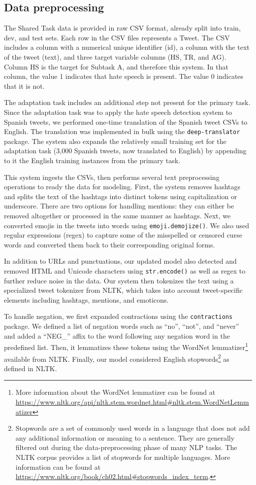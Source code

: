 \documentclass[11pt,a4paper]{article}
\begin{document}
\subsection{Data preprocessing}
The Shared Task data is provided in raw CSV format, already split into train, dev, and test sets. Each row in the CSV files represents a Tweet. The CSV includes a column with a numerical unique identifier (id), a column with the text of the tweet (text), and three target variable columns (HS, TR, and AG). Column HS is the target for Subtask A, and therefore this system. In that column, the value 1 indicates that hate speech is present. The value 0 indicates that it is not.

The adaptation task includes an additional step not present for the primary task. Since the adaptation task was to apply the hate speech detection system to Spanish tweets, we performed one-time translation of the Spanish tweet CSVs to English. The translation was implemented in bulk using the \verb|deep-translator| package. The system also expands the relatively small training set for the adaptation task (3,000 Spanish tweets, now translated to English) by appending to it the English training instances from the primary task.

This system ingests the CSVs, then performs several text preprocessing operations to ready the data for modeling. First, the system removes hashtags and splits the text of the hashtags into distinct tokens using capitalization or underscore. There are two options for handling mentions: they can either be removed altogether or processed in the same manner as hashtags. Next, we converted emojis in the tweets into words using \verb|emoji.demojize()|. We also used regular expressions (regex) to capture some of the misspelled or censored curse words and converted them back to their corresponding original forms.

In addition to URLs and punctuations, our updated model also detected and removed HTML and Unicode characters using \verb|str.encode()| as well as regex to further reduce noise in the data. Our system then tokenizes the text using a specialized tweet tokenizer from NLTK, which takes into account tweet-specific elements including hashtags, mentions, and emoticons.

To handle negation, we first expanded contractions using the \verb|contractions| package. We defined a list of negation words such as “no”, “not”, and “never” and added a “NEG\_” affix to the word following any negation word in the predefined list. Then, it lemmatizes these tokens using the WordNet lemmatizer\footnote{More information about the WordNet lemmatizer can be found at \url{https://www.nltk.org/api/nltk.stem.wordnet.html\#nltk.stem.WordNetLemmatizer}} available from NLTK. Finally, our model considered English stopwords\footnote{Stopwords are a set of commonly used words in a language that does not add any additional information or meaning to a sentence. They are generally filtered out during the data-preprocessing phase of many NLP tasks. The NLTK corpus provides a list of stopwords for multiple languages. More information can be found at \url{https://www.nltk.org/book/ch02.html\#stopwords_index_term}.} as defined in NLTK.
\end{document}
